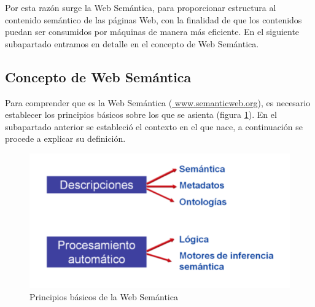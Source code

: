 

Por esta razón surge la Web Semántica, para proporcionar estructura al contenido semántico de las páginas Web, con la finalidad de que los contenidos puedan ser consumidos por máquinas de manera más eficiente. En el siguiente subapartado entramos en detalle en el concepto de Web Semántica.

\subsection{Concepto de Web Semántica} 

Para comprender que es la Web Semántica (\url{ www.semanticweb.org}), es necesario establecer los principios básicos sobre los que se asienta (figura \ref{fig:principio}). En el subapartado anterior se estableció el contexto en el que nace, a continuación se procede a explicar su definición. 

\begin{figure}[H]
	\centering
	\includegraphics[width=0.56\linewidth]{imagenes/capitulo3/principio}
	\caption{Principios básicos de la Web Semántica \cite{aplicacion}}
	\label{fig:principio}
\end{figure}

